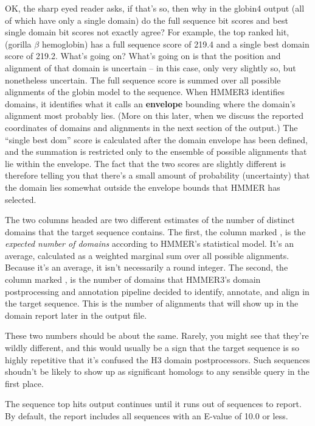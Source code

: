 OK, the sharp eyed reader asks, if that's so, then why in the globin4
output (all of which have only a single domain) do the full sequence
bit scores and best single domain bit scores not exactly agree? For
example, the top ranked hit,  (gorilla $\beta$
hemoglobin) has a full sequence score of 219.4 and a single best
domain score of 219.2. What's going on? What's going on is that the
position and alignment of that domain is uncertain -- in this case,
only very slightly so, but nonetheless uncertain. The full sequence
score is summed over all possible alignments of the globin model to
the  sequence. When HMMER3 identifies domains, it
identifies what it calls an \textbf{envelope} bounding where the
domain's alignment most probably lies. (More on this later, when we
discuss the reported coordinates of domains and alignments in the next
section of the output.) The ``single best dom'' score is calculated
after the domain envelope has been defined, and the summation is
restricted only to the ensemble of possible alignments that lie within
the envelope. The fact that the two scores are slightly different is
therefore telling you that there's a small amount of probability
(uncertainty) that the domain lies somewhat outside the envelope
bounds that HMMER has selected.

The two columns headed  are two different estimates of
the number of distinct domains that the target sequence contains. The
first, the column marked , is the \emph{expected number of
domains} according to HMMER's statistical model. It's an average,
calculated as a weighted marginal sum over all possible
alignments. Because it's an average, it isn't necessarily a round
integer. The second, the column marked , is the number of
domains that HMMER3's domain postprocessing and annotation pipeline
decided to identify, annotate, and align in the target sequence. This
is the number of alignments that will show up in the domain report
later in the output file. 

These two numbers should be about the same. Rarely, you might see that
they're wildly different, and this would usually be a sign that the
target sequence is so highly repetitive that it's confused the H3
domain postprocessors. Such sequences shoudn't be likely to show up as
significant homologs to any sensible query in the first place.


The sequence top hits output continues until it runs out of sequences
to report. By default, the report includes all sequences with an
E-value of 10.0 or less. 

